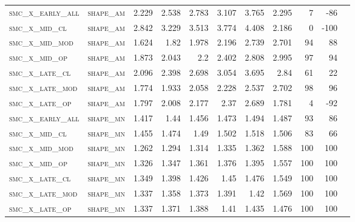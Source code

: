 \begin{landscape}
\begin{center}
\begin{footnotesize}
\begin{longtable}{llrrrrrr|rrr}
\textsc{smc\_x\_early\_all} & \textsc{shape\_am }   & 2.229      & 2.538      & 2.783      & 3.107      & 3.765      & 2.295      & 7     & -86    \\
\textsc{smc\_x\_mid\_cl   } & \textsc{shape\_am }   & 2.842      & 3.229      & 3.513      & 3.774      & 4.408      & 2.186      & 0     & -100   \\
\textsc{smc\_x\_mid\_mod  } & \textsc{shape\_am }   & 1.624      & 1.82       & 1.978      & 2.196      & 2.739      & 2.701      & 94    & 88     \\
\textsc{smc\_x\_mid\_op   } & \textsc{shape\_am }   & 1.873      & 2.043      & 2.2        & 2.402      & 2.808      & 2.995      & 97    & 94     \\
\textsc{smc\_x\_late\_cl  } & \textsc{shape\_am }   & 2.096      & 2.398      & 2.698      & 3.054      & 3.695      & 2.84       & 61    & 22     \\
\textsc{smc\_x\_late\_mod } & \textsc{shape\_am }   & 1.774      & 1.933      & 2.058      & 2.228      & 2.537      & 2.702      & 98    & 96     \\
\textsc{smc\_x\_late\_op  } & \textsc{shape\_am }   & 1.797      & 2.008      & 2.177      & 2.37       & 2.689      & 1.781      & 4     & -92    \\
\textsc{smc\_x\_early\_all} & \textsc{shape\_mn }   & 1.417      & 1.44       & 1.456      & 1.473      & 1.494      & 1.487      & 93    & 86     \\
\textsc{smc\_x\_mid\_cl   } & \textsc{shape\_mn }   & 1.455      & 1.474      & 1.49       & 1.502      & 1.518      & 1.506      & 83    & 66     \\
\textsc{smc\_x\_mid\_mod  } & \textsc{shape\_mn }   & 1.262      & 1.294      & 1.314      & 1.335      & 1.362      & 1.588      & 100   & 100    \\
\textsc{smc\_x\_mid\_op   } & \textsc{shape\_mn }   & 1.326      & 1.347      & 1.361      & 1.376      & 1.395      & 1.557      & 100   & 100    \\
\textsc{smc\_x\_late\_cl  } & \textsc{shape\_mn }   & 1.349      & 1.398      & 1.426      & 1.45       & 1.476      & 1.549      & 100   & 100    \\
\textsc{smc\_x\_late\_mod } & \textsc{shape\_mn }   & 1.337      & 1.358      & 1.373      & 1.391      & 1.42       & 1.569      & 100   & 100    \\
\textsc{smc\_x\_late\_op  } & \textsc{shape\_mn }   & 1.337      & 1.371      & 1.388      & 1.41       & 1.435      & 1.476      & 100   & 100    \\

\end{longtable}
\end{footnotesize}
\end{center}
\end{landscape}

